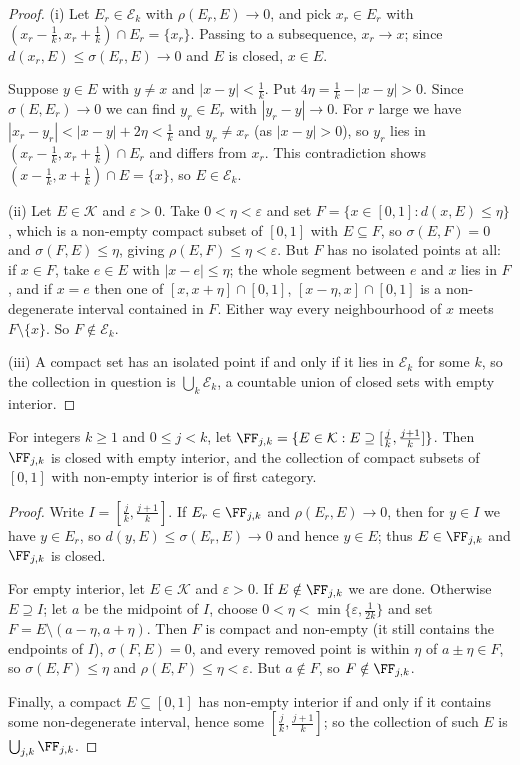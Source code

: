 \documentclass[a4paper]{scrartcl}
\newcommand{\KK}{\mathcal{K}}
\newcommand{\EEE}{\mathcal{E}}
\begin{document}
\begin{proof}
	(i) Let $E_r\in\EEE_k$ with $\rho(E_r,E)\to0$, and pick $x_r\in E_r$ with $(x_r-\tfrac1k,x_r+\tfrac1k)\cap E_r = \{x_r\}$. Passing to a subsequence, $x_r\to x$; since $d(x_r,E)\leq\sigma(E_r,E)\to0$ and $E$ is closed, $x \in E$.

	Suppose $y \in E$ with $y\neq x$ and $|x-y|<\tfrac1k$. Put $4\eta = \tfrac1k-|x-y| > 0$. Since $\sigma(E,E_r)\to0$ we can find $y_r\in E_r$ with $|y_r-y|\to0$. For $r$ large we have $|x_r-y_r| < |x-y|+2\eta<\tfrac1k$ and $y_r\neq x_r$ (as $|x-y|>0$), so $y_r$ lies in $(x_r-\tfrac1k,x_r+\tfrac1k)\cap E_r$ and differs from $x_r$. This contradiction shows $(x-\tfrac1k,x+\tfrac1k)\cap E=\{x\}$, so $E\in\EEE_k$.

	(ii) Let $E\in\KK$ and $\varepsilon>0$. Take $0<\eta<\varepsilon$ and set $F = \{x\in[0,1] : d(x,E)\leq\eta\}$, which is a non-empty compact subset of $[0,1]$ with $E\subseteq F$, so $\sigma(E,F)=0$ and $\sigma(F,E)\leq\eta$, giving $\rho(E,F)\leq\eta<\varepsilon$. But $F$ has no isolated points at all: if $x\in F$, take $e\in E$ with $|x-e|\leq\eta$; the whole segment between $e$ and $x$ lies in $F$, and if $x = e$ then one of $[x,x+\eta]\cap[0,1]$, $[x-\eta,x]\cap[0,1]$ is a non-degenerate interval contained in $F$. Either way every neighbourhood of $x$ meets $F\setminus\{x\}$. So $F\notin\EEE_k$.

	(iii) A compact set has an isolated point if and only if it lies in $\EEE_k$ for some $k$, so the collection in question is $\bigcup_k\EEE_k$, a countable union of closed sets with empty interior.
\end{proof}

\begin{lemma}\label{lem:interior-first-cat}
	For integers $k\geq1$ and $0\leq j<k$, let $\FF_{j,k} = \{E\in\KK : E\supseteq[\tfrac jk,\tfrac{j+1}{k}]\}$. Then $\FF_{j,k}$ is closed with empty interior, and the collection of compact subsets of $[0,1]$ with non-empty interior is of first category.
\end{lemma}

\begin{proof}
	Write $I = [\tfrac jk,\tfrac{j+1}k]$. If $E_r\in\FF_{j,k}$ and $\rho(E_r,E)\to0$, then for $y \in I$ we have $y\in E_r$, so $d(y,E)\leq\sigma(E_r,E)\to0$ and hence $y \in E$; thus $E \in\FF_{j,k}$ and $\FF_{j,k}$ is closed.

	For empty interior, let $E\in\KK$ and $\varepsilon>0$. If $E\notin\FF_{j,k}$ we are done. Otherwise $E\supseteq I$; let $a$ be the midpoint of $I$, choose $0<\eta<\min\{\varepsilon,\tfrac1{2k}\}$ and set $F = E\setminus(a-\eta,a+\eta)$. Then $F$ is compact and non-empty (it still contains the endpoints of $I$), $\sigma(F,E)=0$, and every removed point is within $\eta$ of $a\pm\eta\in F$, so $\sigma(E,F)\leq\eta$ and $\rho(E,F)\leq\eta<\varepsilon$. But $a\notin F$, so $F\notin\FF_{j,k}$.

	Finally, a compact $E\subseteq[0,1]$ has non-empty interior if and only if it contains some non-degenerate interval, hence some $[\tfrac jk,\tfrac{j+1}k]$; so the collection of such $E$ is $\bigcup_{j,k}\FF_{j,k}$.
\end{proof}
\end{document}
